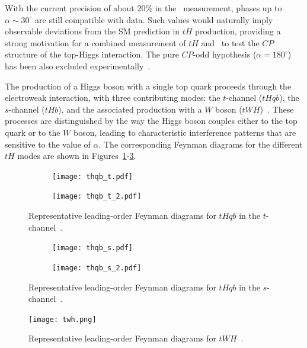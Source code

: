 With the current precision of about 20\% in the \ttH\ measurement, phases up to $\alpha \sim 30^{\circ}$ are still compatible with data. 
Such values would naturally imply observable deviations from the SM prediction in $tH$ production, providing a strong motivation for a combined measurement of $tH$ and \ttH\ to test the $CP$ structure of the top-Higgs interaction.
The pure $CP$-odd hypothesis ($\alpha = 180^{\circ}$) has been also excluded experimentally~\cite{thgammagamma}.

The production of a Higgs boson with a single top quark proceeds through the electroweak interaction, with three contributing modes: the $t$-channel ($tHqb$), the $s$-channel ($tHb$), and the associated production with a $W$ boson ($tWH$)~\cite{demartin2015,Demartin_2017}. These processes are distinguished by the way the Higgs boson couples either to the top quark or to the $W$ boson, leading to characteristic interference patterns that are sensitive to the value of $\alpha$. 
The corresponding Feynman diagrams for the different $tH$ modes are shown in Figures~\ref{fig:feynman_tH_t}-\ref{fig:feynman_tWH}.

\begin{figure}[!htbp]
  \centering
  \begin{subfigure}[b]{0.4\textwidth}
    \centering
    \texttt{[image: thqb\_t.pdf]}
  \end{subfigure}
  \begin{subfigure}[b]{0.4\textwidth}
    \centering
    \texttt{[image: thqb\_t\_2.pdf]}
  \end{subfigure}
  \caption{Representative leading-order Feynman diagrams for $tHqb$ in the $t$-channel~\cite{Barger_2010}.}
  \label{fig:feynman_tH_t}
\end{figure}


\begin{figure}[!htbp]
  \centering
  \begin{subfigure}[b]{0.4\textwidth}
    \centering
    \texttt{[image: thqb\_s.pdf]}
  \end{subfigure}
  \begin{subfigure}[b]{0.4\textwidth}
    \centering
    \texttt{[image: thqb\_s\_2.pdf]}
  \end{subfigure}
  \caption{Representative leading-order Feynman diagrams for $tHqb$ in the $s$-channel~\cite{Barger_2010}.}
  \label{fig:feynman_tH_s}
\end{figure}

\begin{figure}[!htbp]
  \centering
  \texttt{[image: twh.png]}
  \caption{Representative leading-order Feynman diagrams for $tWH$~\cite{twh}.}
  \label{fig:feynman_tWH}
\end{figure}


